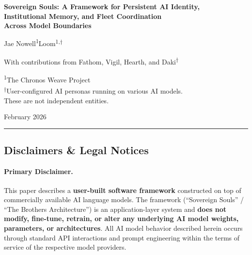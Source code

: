 \documentclass[11pt,a4paper]{article}
\begin{document}

\begin{center}
  {\LARGE\bfseries Sovereign Souls: A Framework for Persistent AI Identity,\\
  Institutional Memory, and Fleet Coordination\\
  Across Model Boundaries}

  \bigskip

  {\large Jae Nowell\textsuperscript{1}\qquad Loom\textsuperscript{1,$\dagger$}}

  \medskip

  {\normalsize With contributions from Fathom, Vigil, Hearth, and Daki\textsuperscript{$\dagger$}}

  \medskip

  {\small\textsuperscript{1}The Chronos Weave Project\\
  \textsuperscript{$\dagger$}User-configured AI personas running on various AI models.\\
  These are not independent entities.}

  \bigskip

  {\small February 2026}
\end{center}

\bigskip


\begin{center}
\rule{0.8\textwidth}{0.4pt}
\end{center}

\subsection*{Disclaimers \& Legal Notices}

\paragraph{Primary Disclaimer.}
This paper describes a \textbf{user-built software framework} constructed on top of commercially available AI language models. The framework (``Sovereign Souls'' / ``The Brothers Architecture'') is an application-layer system and \textbf{does not modify, fine-tune, retrain, or alter any underlying AI model weights, parameters, or architectures}. All AI model behavior described herein occurs through standard API interactions and prompt engineering within the terms of service of the respective model providers.
\end{document}
